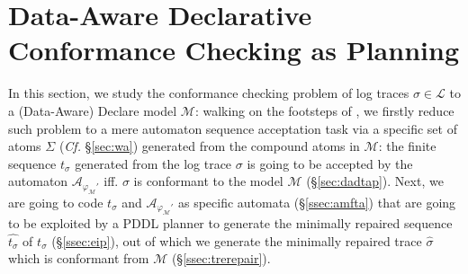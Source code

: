 \section{Data-Aware Declarative Conformance Checking as Planning}\label{sec:dccap}
In this section, we study the conformance checking problem of log traces $\sigma\in\mathcal{L}$ to a (Data-Aware) Declare model $\mathcal{M}$: walking on the footsteps of \cite{XuLZ17a,MaggiMCA18}, we firstly reduce such problem to a mere automaton sequence acceptation task via a specific set of atoms $\Sigma$ (\textit{Cf.} \S\ref{sec:wa}) generated from the compound atoms in  $\mathcal{M}$: the finite sequence $t_\sigma$ generated from the log trace $\sigma$ is going to be accepted by the automaton $\mathcal{A}_{\varphi_{\mathcal{M}}'}$ iff. $\sigma$ is conformant to the model $\mathcal{M}$ (\S\ref{sec:dadtap}). Next, we are going to code $t_\sigma$ and $\mathcal{A}_{\varphi_{\mathcal{M}}'}$ as specific automata (\S\ref{ssec:amfta}) that are going to be exploited by a PDDL planner to generate the minimally repaired sequence $\hat{t_\sigma}$ of $t_\sigma$ (\S\ref{ssec:eip}), out of which we generate the minimally repaired trace $\hat{\sigma}$ which is conformant from $\mathcal{M}$ (\S\ref{ssec:trerepair}).






